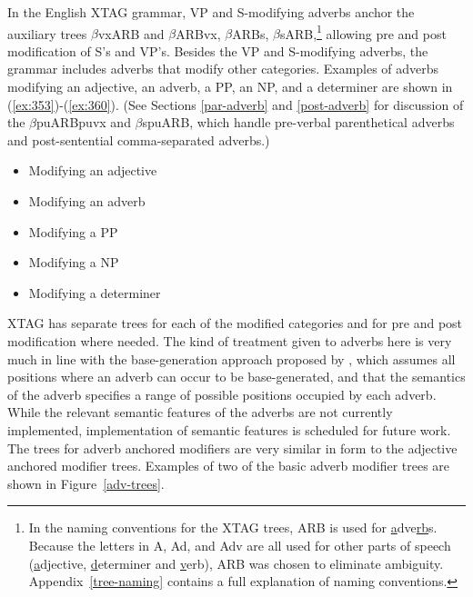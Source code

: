 In the English XTAG grammar, VP and S-modifying adverbs anchor the 
auxiliary trees $\beta$vxARB and $\beta$ARBvx, $\beta$ARBs, 
$\beta$sARB,\footnote{In the naming conventions for the XTAG trees, ARB is used for {\underline a}dve{\underline {rb}}s.  Because the letters in A, Ad, and Adv are all used for other parts of speech ({\underline a}djective, {\underline d}eterminer and {\underline v}erb), ARB was chosen to eliminate ambiguity. Appendix~\ref{tree-naming} contains a full explanation of naming conventions.}  allowing pre and post modification of S's and VP's. 
Besides the VP and S-modifying adverbs, the grammar includes adverbs 
that modify other categories. Examples of adverbs modifying an 
adjective, an adverb, a PP, an NP, and a determiner are shown in 
(\ref{ex:353})-(\ref{ex:360}). (See Sections \ref{par-adverb} and 
\ref{post-adverb} for discussion of the $\beta$puARBpuvx and 
$\beta$spuARB, which handle pre-verbal parenthetical adverbs and 
post-sentential comma-separated adverbs.) 
 
\begin{itemize} 
\item{Modifying an adjective} 
\beginsentences
{}\label{ex:353} 
\label{ex:354} 
\label{ex:355} 
\endsentences

 
\item{Modifying an adverb} 
\beginsentences
{}\label{ex:356} 
\label{ex:357} 
\endsentences

 
\item{Modifying a PP} 
\beginsentences
{}\label{ex:358} 
\endsentences

 
\item{Modifying a NP} 
\beginsentences
{}\label{ex:359} 
\endsentences

 
\item{Modifying a determiner} 
\beginsentences
{}\label{ex:360} 
\endsentences

 
\end{itemize} 
 
XTAG has separate trees for each of the modified categories and for pre and 
post modification where needed.  The kind of treatment given to adverbs here is 
very much in line with the base-generation approach proposed by \cite{Ernst84}, 
which assumes all positions where an adverb can occur to be base-generated, and 
that the semantics of the adverb specifies a range of possible positions 
occupied by each adverb. While the relevant semantic features of the adverbs 
are not currently implemented, implementation of semantic features is scheduled 
for future work.  The trees for adverb anchored modifiers are very similar in 
form to the adjective anchored modifier trees.  Examples of two of the basic 
adverb modifier trees are shown in Figure~\ref{adv-trees}. 
 
